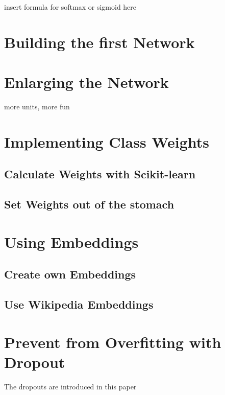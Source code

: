 insert formula for softmax or sigmoid here

\section{Building the first Network}

\section{Enlarging the Network}

more units, more fun

\section{Implementing Class Weights}

\subsection{Calculate Weights with Scikit-learn}

\subsection{Set Weights out of the stomach}

\section{Using Embeddings}

\subsection{Create own Embeddings}

\subsection{Use Wikipedia Embeddings}

\section{Prevent from Overfitting with Dropout}

The dropouts are introduced in this paper \cite{drop14}
